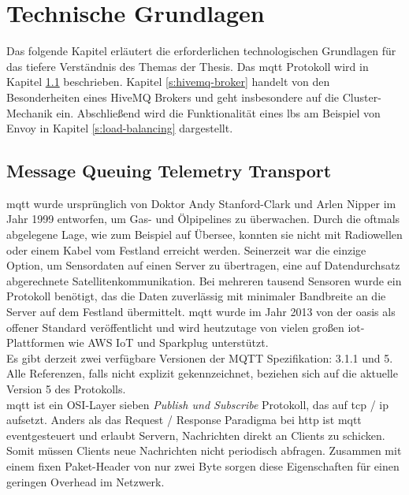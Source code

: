 \section{Technische Grundlagen} \label{s:basics}
Das folgende Kapitel erläutert die erforderlichen technologischen Grundlagen für das tiefere Verständnis des Themas der Thesis.
Das \acs{mqtt} Protokoll wird in Kapitel \ref{s:mqtt} beschrieben.
Kapitel \ref{s:hivemq-broker} handelt von den Besonderheiten eines HiveMQ Brokers und geht insbesondere auf die Cluster-Mechanik ein.
Abschlie{\ss}end wird die Funktionalität eines \aclp{lb} am Beispiel von Envoy in Kapitel \ref{s:load-balancing} dargestellt.

\subsection{Message Queuing Telemetry Transport} \label{s:mqtt}
\acf{mqtt} wurde ursprünglich von Doktor Andy Stanford-Clark und Arlen Nipper im Jahr 1999 entworfen, um Gas- und Ölpipelines zu überwachen.
Durch die oftmals abgelegene Lage, wie zum Beispiel auf Übersee, konnten sie nicht mit Radiowellen oder einem Kabel vom Festland erreicht werden. Seinerzeit war die einzige Option, um Sensordaten auf einen Server zu übertragen, eine auf Datendurchsatz abgerechnete Satellitenkommunikation. Bei mehreren tausend Sensoren wurde ein Protokoll benötigt, das die Daten zuverlässig mit minimaler Bandbreite an die Server auf dem Festland übermittelt.
\ac{mqtt} wurde im Jahr 2013 von der \ac{oasis} als offener Standard veröffentlicht und wird heutzutage von vielen gro{\ss}en \ac{iot}-Plattformen wie AWS IoT und Sparkplug unterstützt.
\cite{WhatMQTTDefinition}\\
Es gibt derzeit zwei verfügbare Versionen der MQTT Spezifikation: 3.1.1 und 5. Alle Referenzen, falls nicht explizit gekennzeichnet, beziehen sich auf die aktuelle Version 5 des Protokolls.\\
\ac{mqtt} ist ein OSI-Layer sieben \textit{Publish und Subscribe} Protokoll, das auf \acs{tcp} / \acs{ip} aufsetzt. Anders als das Request / Response Paradigma bei \acs{http} ist \ac{mqtt} eventgesteuert und erlaubt Servern, Nachrichten direkt an Clients zu schicken.
Somit müssen Clients neue Nachrichten nicht periodisch abfragen. Zusammen mit einem fixen Paket-Header von nur zwei Byte sorgen diese Eigenschaften für einen geringen Overhead im Netzwerk.\cite{WhatMQTTDefinition}

